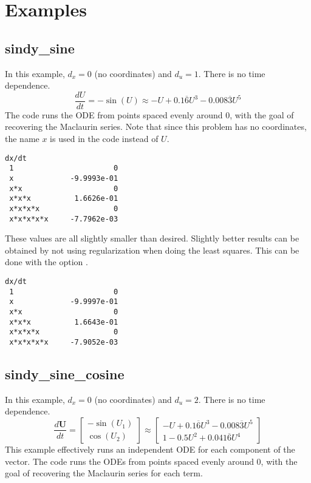 \documentclass{article}
\let\vec\mathbf
\def\lstinline#1{}%
\begin{document}
\section{Examples}

\subsection{sindy\_sine}
In this example, $d_x = 0$ (no coordinates) and $d_u = 1$. There is no time dependence.
\begin{equation*}
\frac{dU}{dt} = -\sin(U) \approx -U + 0.1\overline{6}U^3 - 0.008\overline{3}U^5
\end{equation*}
The code runs the ODE from points spaced evenly around 0, with the goal of
recovering the Maclaurin series. Note that since this problem has no
coordinates, the name $x$ is used in the code instead of $U$.
\begin{lstlisting}[language={}]
                    dx/dt
 1                       0
 x             -9.9993e-01
 x*x                     0
 x*x*x          1.6626e-01
 x*x*x*x                 0
 x*x*x*x*x     -7.7962e-03
\end{lstlisting}
These values are all slightly smaller than desired. Slightly better results can
be obtained by not using regularization when doing the least squares. This can
be done with the option \lstinline{-tao_brgn_regularizer_weight 0}.
\begin{lstlisting}[language={}]
                    dx/dt
 1                       0
 x             -9.9997e-01
 x*x                     0
 x*x*x          1.6643e-01
 x*x*x*x                 0
 x*x*x*x*x     -7.9052e-03
\end{lstlisting}


\subsection{sindy\_sine\_cosine}
In this example, $d_x = 0$ (no coordinates) and $d_u = 2$. There is no time dependence.
\begin{equation*}
\frac{d\vec{U}}{dt} =
\begin{bmatrix}
-\sin(U_1) \\ \cos(U_2)
\end{bmatrix}
\approx
\begin{bmatrix}
 -U + 0.1\overline{6}U^3 - 0.008\overline{3}U^5 \\  1 - 0.5U^2 +  0.041\overline{6}U^4
\end{bmatrix}
\end{equation*}
This example effectively runs an independent ODE for each component of the vector.
The code runs the ODEs from points spaced evenly around 0, with the goal of
recovering the Maclaurin series for each term.
\end{document}
